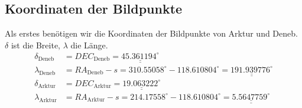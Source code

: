 \subsection{Koordinaten der Bildpunkte}
Als erstes benötigen wir die Koordinaten der Bildpunkte von Arktur und Deneb. 
$\delta$ ist die Breite, $\lambda$ die Länge.
\begin{align}
\delta_{\text{Deneb}}&=DEC_{\text{Deneb}} = \underline{\underline{45.361194^\circ}} \nonumber \\ 
\lambda_{\text{Deneb}}&=RA_{\text{Deneb}} - s = 310.55058^\circ -118.610804^\circ =\underline{\underline{191.939776^\circ}}   \nonumber \\ 
\delta_{\text{Arktur}}&=DEC_{\text{Arktur}} =  \underline{\underline{19.063222^\circ}} \nonumber \\ 
\lambda_{\text{Arktur}}&=RA_{\text{Arktur}} - s = 214.17558^\circ -118.610804^\circ = \underline{\underline{5.5647759^\circ}}  \nonumber  
\end{align}


